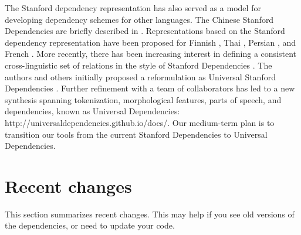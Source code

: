 \documentclass[11pt,letterpaper]{article}
\def\url#1{\textsf{#1}}
\begin{document}
The Stanford dependency representation has also served as a model for
developing dependency schemes for other languages. The Chinese Stanford
Dependencies are briefly described in
\citet{chang-tseng-jurafsky-manning:2009:SSST}. Representations
based on the Stanford dependency representation have been proposed for
Finnish \citep{Haverinen2010a,Haverinen2010b}, Thai \citep{Potisuk10},
Persian \citep{Seraji12}, and French \citep{Maarouf12}. 
More recently, there has been increasing interest in defining a
consistent cross-linguistic set of relations in the style of Stanford
Dependencies
\citep{mcdonald-EtAl:2013:Short,tsarfaty:2013:Short}. The authors and
others initially proposed a reformulation as Universal Stanford
Dependencies \citep{marneffe14universal}. Further refinement with a
team of collaborators has led to a new synthesis spanning
tokenization, morphological features, parts of speech, and
dependencies, known as Universal Dependencies: 
\url{http://universaldependencies.github.io/docs/}.  Our medium-term
plan is to transition our tools from the current Stanford Dependencies
to Universal Dependencies.


\section{Recent changes}

This section summarizes recent changes. This may help if you see old
versions of the dependencies, or need to update your code.
\end{document}
